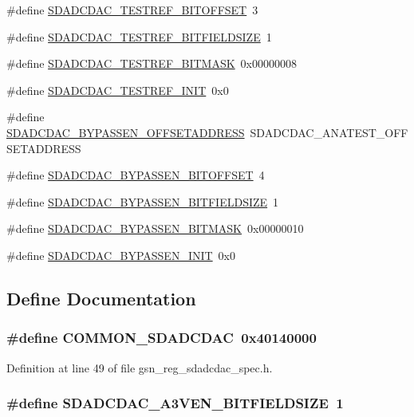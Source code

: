 \begin{DoxyCompactItemize}
\item 
\#define \hyperlink{a00569_ac612b405c933e4614fc2a9857b7031e3}{SDADCDAC\_\-TESTREF\_\-BITOFFSET}~3
\item 
\#define \hyperlink{a00569_acf5ac3dbb1a256d07c2305d7f1290452}{SDADCDAC\_\-TESTREF\_\-BITFIELDSIZE}~1
\item 
\#define \hyperlink{a00569_ac3322431c89e53dac4b3f706e12e7f09}{SDADCDAC\_\-TESTREF\_\-BITMASK}~0x00000008
\item 
\#define \hyperlink{a00569_af46c3f49cf5c996880b6e1ee54ef8f2a}{SDADCDAC\_\-TESTREF\_\-INIT}~0x0
\item 
\#define \hyperlink{a00569_ad7303223c31cb81a887ec93c3c0226a9}{SDADCDAC\_\-BYPASSEN\_\-OFFSETADDRESS}~SDADCDAC\_\-ANATEST\_\-OFFSETADDRESS
\item 
\#define \hyperlink{a00569_a3a33130feef7b821e09ffbd739bf63a9}{SDADCDAC\_\-BYPASSEN\_\-BITOFFSET}~4
\item 
\#define \hyperlink{a00569_a846f93ac181074d68aa58b29b6d28677}{SDADCDAC\_\-BYPASSEN\_\-BITFIELDSIZE}~1
\item 
\#define \hyperlink{a00569_a0a974161fab063759848504792fa4359}{SDADCDAC\_\-BYPASSEN\_\-BITMASK}~0x00000010
\item 
\#define \hyperlink{a00569_a5c86f370922f721979463bf3a556312b}{SDADCDAC\_\-BYPASSEN\_\-INIT}~0x0
\end{DoxyCompactItemize}


\subsection{Define Documentation}
\hypertarget{a00569_a3957de51060555c8741e7927dc8298b4}{
\subsubsection[{COMMON\_\-SDADCDAC}]{\setlength{\rightskip}{0pt plus 5cm}\#define COMMON\_\-SDADCDAC~0x40140000}}
\label{a00569_a3957de51060555c8741e7927dc8298b4}


Definition at line 49 of file gsn\_\-reg\_\-sdadcdac\_\-spec.h.

\hypertarget{a00569_a88146829571d1c8185a8bb52d43c0dfc}{
\subsubsection[{SDADCDAC\_\-A3VEN\_\-BITFIELDSIZE}]{\setlength{\rightskip}{0pt plus 5cm}\#define SDADCDAC\_\-A3VEN\_\-BITFIELDSIZE~1}}
\label{a00569_a88146829571d1c8185a8bb52d43c0dfc}


